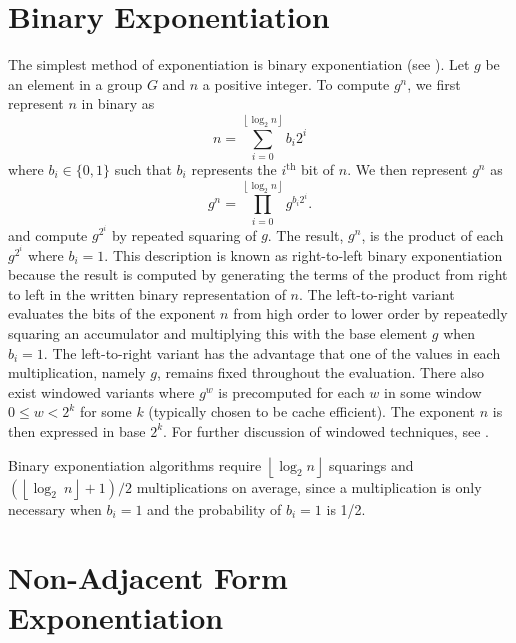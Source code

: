 \documentclass{ucalgthes1}
\theoremstyle{definition}
\newcommand{\floor}[1]{\left\lfloor #1 \right\rfloor}
\begin{document}
\section{Binary Exponentiation}
\label{sec:binaryExp}
The simplest method of exponentiation is binary exponentiation (see \cite[\S 9.1.1]{Cohen2006}).  Let $g$ be an element in a group $G$ and $n$ a positive integer.  To compute $g^n$, we first represent $n$ in binary as
\[
	n = \sum_{i=0}^{\floor{\log_2 n}} b_i 2^i
\]
where $b_i \in \{0, 1\}$ such that $b_i$ represents the $i^{\textrm{th}}$ bit of $n$.  We then represent $g^n$ as
\[
	g^n = \prod_{i=0}^{\floor{\log_2 n}} g^{b_i 2^i}.
\]
and compute $g^{2^i}$ by repeated squaring of $g$.  The result, $g^n$, is the product of each $g^{2^i}$ where $b_i = 1$.  This description is known as right-to-left binary exponentiation because the result is computed by generating the terms of the product from right to left in the written binary representation of $n$.  The left-to-right variant evaluates the bits of the exponent $n$ from high order to lower order by repeatedly squaring an accumulator and multiplying this with the base element $g$ when $b_i = 1$.  The left-to-right variant has the advantage that one of the values in each multiplication, namely $g$, remains fixed throughout the evaluation.  There also exist windowed variants where $g^w$ is precomputed for each $w$ in some window $0 \le w < 2^k$ for some $k$ (typically chosen to be cache efficient). The exponent $n$ is then expressed in base $2^k$.  For further discussion of windowed techniques, see \cite[Subsection~9.1.3.~p.149]{Cohen2006}.

Binary exponentiation algorithms require $\floor{\log_2 n}$ squarings and $\left(\floor{\log_2~n} + 1 \right)/2$ multiplications on average, since a multiplication is only necessary when $b_i = 1$ and the probability of $b_i = 1$ is 1/2.


\section{Non-Adjacent Form Exponentiation}
\label{sec:naf}
\end{document}
